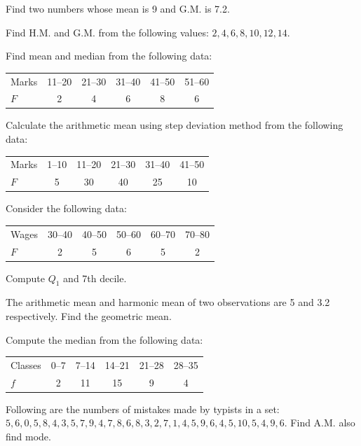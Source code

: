 \documentclass[11pt,a4paper]{article}
\begin{document}
\begin{longlist}
\item Find two numbers whose mean is 9 and G.M. is 7.2.

\item Find H.M. and G.M. from the following values: $2,4,6,8,10,12,14$.

\item Find mean and median from the following data:
\begin{center}
\begin{tabular}{l|ccccc}
Marks & 11--20 & 21--30 & 31--40 & 41--50 & 51--60 \\
$F$ & 2 & 4 & 6 & 8 & 6
\end{tabular}
\end{center}

\item Calculate the arithmetic mean using step deviation method from the following data:
\begin{center}
\begin{tabular}{l|ccccc}
Marks & 1--10 & 11--20 & 21--30 & 31--40 & 41--50 \\
$F$ & 5 & 30 & 40 & 25 & 10
\end{tabular}
\end{center}

\item Consider the following data:
\begin{center}
\begin{tabular}{l|ccccc}
Wages & 30--40 & 40--50 & 50--60 & 60--70 & 70--80 \\
$F$ & 2 & 5 & 6 & 5 & 2
\end{tabular}
\end{center}
Compute $Q_1$ and 7th decile.

\item The arithmetic mean and harmonic mean of two observations are 5 and 3.2 respectively. Find the geometric mean.

\item Compute the median from the following data:
\begin{center}
\begin{tabular}{l|ccccc}
Classes & 0--7 & 7--14 & 14--21 & 21--28 & 28--35 \\
$f$ & 2 & 11 & 15 & 9 & 4
\end{tabular}
\end{center}

\item Following are the numbers of mistakes made by typists in a set: $5,6,0,5,8,4,3,5,7,9,4,7,8,6,8,3,2,7,1,4,5,9,6,4,5,10,5,4,9,6$. Find A.M. also find mode.


\end{longlist}
\end{document}
